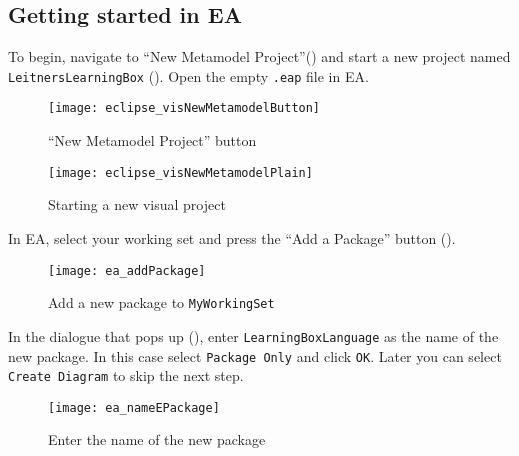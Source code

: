 \newpage
\hypertarget{static:starting vis}{}
\subsection{Getting started in EA}
\genHeader
  
\begin{stepbystep}

\item  To begin, navigate to ``New Metamodel Project''() and start a new project named \texttt{Leit\-ners\-Learn\-ing\-Box} (). Open the empty \texttt{.eap} file in EA.

\vspace{0.5cm}

\begin{figure}[htbp]
	\centering
  \texttt{[image: eclipse\_visNewMetamodelButton]}
	\caption{``New Metamodel Project'' button}
	\label{eclipse:newVisModelButton}
\end{figure}
\begin{figure}[htbp]
	\centering
  \texttt{[image: eclipse\_visNewMetamodelPlain]}
	\caption{Starting a new visual project}
	\label{eclipse:newVisModel}
\end{figure}

\vspace{0.5cm}

\item In EA, select your working set and press the ``Add a Package'' button (). 

\begin{figure}[htbp]
	\centering
  \texttt{[image: ea\_addPackage]}
	\caption{Add a new package to \texttt{MyWorkingSet}}
	\label{ea:newPackage}
	\vspace{0.5cm}
\end{figure}

\clearpage

\item In the dialogue that pops up (), enter \texttt{LearningBoxLanguage} as the name of the new
package. In this case select \texttt{Package Only} and click \texttt{OK}. Later you can select \texttt{Create Diagram} to skip the next step.

\vspace{0.5cm}

\begin{figure}[htbp]
	\centering
    \texttt{[image: ea\_nameEPackage]}
	\caption{Enter the name of the new package}
	\label{ea:newPackageName}
\end{figure}
\FloatBarrier


\end{stepbystep}
